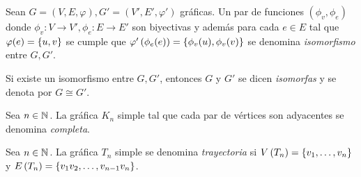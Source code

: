 \begin{figure}[H]
	\centering
\end{figure}
\begin{definition}[Isomorfismo]
	Sean $G = (V, E,\varphi), G' = (V', E',\varphi')$ gráficas. Un par de funciones $(\phi_{v},\phi_{e})$ donde $\phi_{v} : V\to V', \phi_{e} : E\to E'$ son biyectivas y además para cada $e\in E$ tal que $\varphi(e) =\left\{ u, v \right\}$ se cumple que $\varphi'\left( \phi_{e}(e) \right) =\left\{ \phi_{v}(u),\phi_{v}(v) \right\}$ se denomina \emph{isomorfismo} entre $G, G'$.\par 
	Si existe un isomorfismo entre $G, G'$, entonces $G$ y $G'$ se dicen \emph{isomorfas} y se denota por $G\cong G'$.
\end{definition}
\begin{figure}[H]
	\centering
\end{figure}
\begin{definition}
	Sea $n\in\mathbb{N}^{}$. La gráfica $K_{n}$ simple tal que cada par de vértices son adyacentes se denomina \emph{completa}.
\end{definition}
\begin{figure}[H]
	\centering
\end{figure}
\begin{definition}[Trayectoria]
	Sea $n\in\mathbb{N}^{}$. La gráfica $T_{n}$ simple se denomina \emph{trayectoria} si $V\left( T_{n} \right) =\left\{ v_{1},\dotsc, v_{n} \right\}$ y $E\left( T_{n} \right) =\left\{ v_{1}v_{2},\dotsc, v_{n - 1}v_{n} \right\}$.
\end{definition}
\begin{figure}[H]
	\centering
\end{figure}
